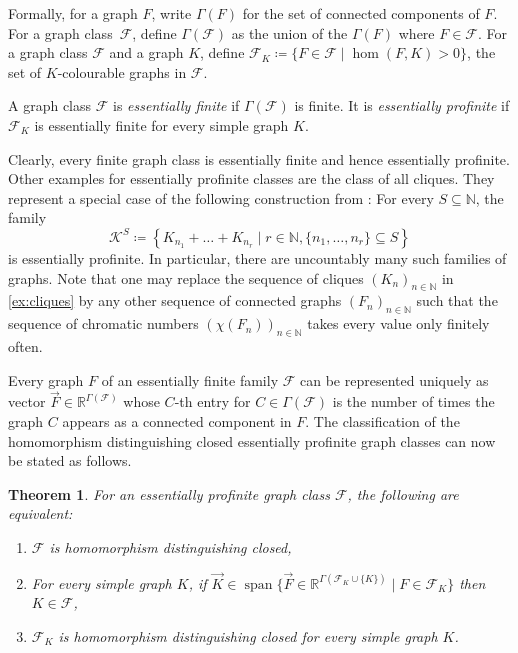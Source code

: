 \documentclass[3p,final]{elsarticle}
\DeclareMathOperator{\spn}{span}
\newtheorem{theorem}{Theorem}
\begin{document}
	Formally, for a graph $F$, write $\Gamma(F)$ for the set of connected components of $F$. For a graph class~$\mathcal{F}$, define $\Gamma(\mathcal{F})$ as the union of the $\Gamma(F)$ where $F \in \mathcal{F}$.
	For a graph class $\mathcal{F}$ and a graph $K$, define $\mathcal{F}_K \coloneqq \{F \in \mathcal{F} \mid \hom(F, K) > 0 \}$, the set of $K$-colourable graphs in $\mathcal{F}$.
	
	\begin{definition} \label{def:profinite}
		A graph class $\mathcal{F}$ is \emph{essentially finite} if $\Gamma(\mathcal{F})$ is finite.
		It is \emph{essentially profinite} if $\mathcal{F}_K$ is essentially finite for every simple graph $K$.
	\end{definition}

	
	Clearly, every finite graph class is essentially finite and hence essentially profinite.
	Other examples for essentially profinite classes are the class of all cliques.
	They represent a special case of the following construction from \cite[Theorem~6.16]{roberson_oddomorphisms_2022}:
	For every $S \subseteq \mathbb{N}$, the family
	\begin{equation} \label{ex:cliques}
	\mathcal{K}^S \coloneqq \left\{K_{n_1} + \dots + K_{n_r} \mid r \in \mathbb{N}, \{n_1, \dots, n_r\} \subseteq S \right\}
	\end{equation}
	is essentially profinite.
	In particular, there are uncountably many such families of graphs.
	Note that one may replace the sequence of cliques $(K_n)_{n\in \mathbb{N}}$ in \cref{ex:cliques} by any other sequence of connected graphs $(F_n)_{n \in \mathbb{N}}$ such that the sequence of chromatic numbers $(\chi(F_n))_{n \in \mathbb{N}}$ takes every value only finitely often.
	
	Every graph $F$ of an essentially finite family $\mathcal{F}$ can be represented uniquely as vector $\vec{F} \in \mathbb{R}^{\Gamma(\mathcal{F})}$  whose $C$-th entry for $C \in \Gamma(\mathcal{F})$ is the number of times the graph $C$ appears as a connected component in $F$.
	The classification of the homomorphism distinguishing closed essentially profinite graph classes can now be stated as follows.
	
	
	\begin{theorem} \label{thm:profinite}
		For an essentially profinite graph class $\mathcal{F}$, the following are equivalent:
		\begin{enumerate}
			\item $\mathcal{F}$ is homomorphism distinguishing closed,\label{pf1}
			\item For every simple graph $K$,
			if $\vec{K} \in \spn \{\vec{F} \in \mathbb{R}^{\Gamma(\mathcal{F}_{K} \cup \{K\})} \mid F \in \mathcal{F}_{K}\}$ then $K \in \mathcal{F}$,
			\label{pf2}
			\item $\mathcal{F}_K$ is homomorphism distinguishing closed for every simple graph $K$.\label{pf3}
		\end{enumerate}
	\end{theorem}
	
\end{document}

